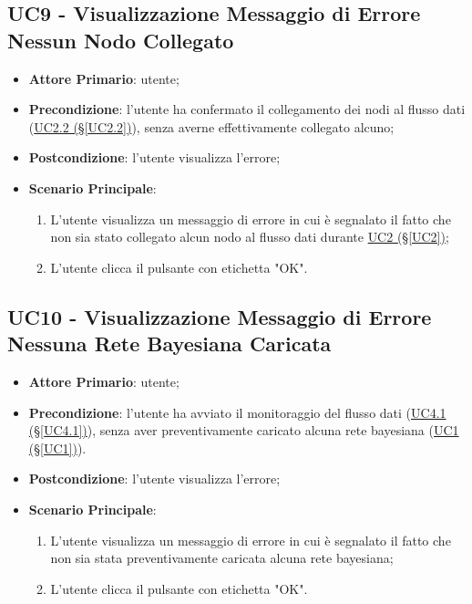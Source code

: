 \pagebreak

\subsection{UC9 - Visualizzazione Messaggio di Errore Nessun Nodo Collegato}\label{UC9}
\begin{itemize}
\item \textbf{Attore Primario}: utente;
\item \textbf{Precondizione}: l'utente ha confermato il collegamento dei nodi al flusso dati (\hyperref[UC2.2]{UC2.2 (§\ref*{UC2.2})}), senza averne effettivamente collegato alcuno;
\item \textbf{Postcondizione}: l'utente visualizza l'errore;
\item \textbf{Scenario Principale}: 
	\begin{enumerate}
	\item L'utente visualizza un messaggio di errore in cui è segnalato il fatto che non sia stato collegato alcun 				nodo al flusso dati durante \hyperref[UC2]{UC2 (§\ref*{UC2})};
	\item L'utente clicca il pulsante con etichetta "OK".
	\end{enumerate}
\end{itemize}

\pagebreak

\subsection{UC10 - Visualizzazione Messaggio di Errore Nessuna Rete Bayesiana Caricata}\label{UC10}
\begin{itemize}
\item \textbf{Attore Primario}: utente;
\item \textbf{Precondizione}: l'utente ha avviato il monitoraggio del flusso dati (\hyperref[UC4.1]{UC4.1 (§\ref*{UC4.1})}), senza aver preventivamente caricato alcuna rete bayesiana (\hyperref[UC1]{UC1 (§\ref*{UC1})}).
\item \textbf{Postcondizione}: l'utente visualizza l'errore;
\item \textbf{Scenario Principale}: 
	\begin{enumerate}
	\item L'utente visualizza un messaggio di errore in cui è segnalato il fatto che non sia stata preventivamente 				caricata alcuna rete bayesiana;
	\item L'utente clicca il pulsante con etichetta "OK".
	\end{enumerate}
\end{itemize}

